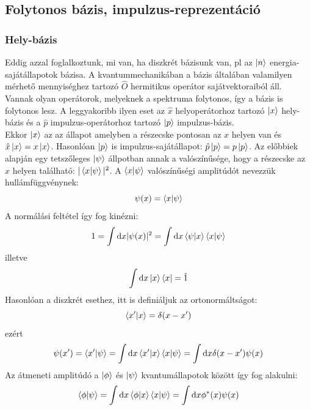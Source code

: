 \subsection{Folytonos bázis, impulzus-reprezentáció}
\subsubsection{Hely-bázis}
Eddig azzal foglalkoztunk, mi van, ha diszkrét bázisunk van, pl az $\ket n$ energia-sajátállapotok bázisa. 
A kvantummechanikában a bázis általában valamilyen mérhető mennyiséghez tartozó $\hat O$ hermitikus operátor sajátvektoraiból áll.
Vannak olyan operátorok, melyeknek a spektruma folytonos, így a bázis is folytonos lesz.
A leggyakoribb ilyen eset az $\hat x$ helyoperátorhoz tartozó $\ket x$ hely-bázis és a $\hat p$ impulzus-operátorhoz
tartozó $\ket p$ impulzus-bázis.
\\
Ekkor $\ket x$ az az állapot amelyben a részecske pontosan az $x$ helyen van és $\hat x\ket x = x\ket x$.
Hasonlóan $\ket p$ is impulzus-sajátállapot: $\hat p\ket p = p\ket p$.
Az előbbiek alapján egy tetszőleges $\ket\psi$ állpotban annak a valószínűsége, hogy a részecske az $x$ helyen található:
$|\braket{x|\psi}|^2$. A $\braket{x|\psi}$ valószínűségi amplitúdót nevezzük hullámfüggvénynek:
\begin{equation}
    \psi(x)=\braket{x|\psi}
\end{equation}
A normálási feltétel így fog kinézni:
\begin{equation}
    1 = \int\textrm{d} x |\psi(x)|^2 = \int\textrm{d} x \braket{\psi|x}\braket{x|\psi}
\end{equation} 
illetve
\begin{equation}
    \int\textrm{d} x \ket x \bra x = \hat 1
\end{equation}
Hasonlóan a diszkrét esethez, itt is definiáljuk az ortonormáltságot:
\begin{equation}
    \braket{x'|x} = \delta(x-x')
\end{equation}
ezért 
\begin{equation}
    \psi(x') = \braket{x'|\psi} = \int\textrm{d} x \braket{x'|x}\braket{x|\psi} = \int\textrm{d} x \delta (x-x')\psi(x)
\end{equation}
Az átmeneti amplitúdó a $\ket\phi$ és $\ket\psi$ kvantumállapotok között így fog alakulni:
\begin{equation}
    \braket{\phi|\psi} = \int\textrm{d} x \braket{\phi|x}\braket{x|\psi} = \int\textrm{d} x \phi^{*}(x)\psi(x)
\end{equation}

